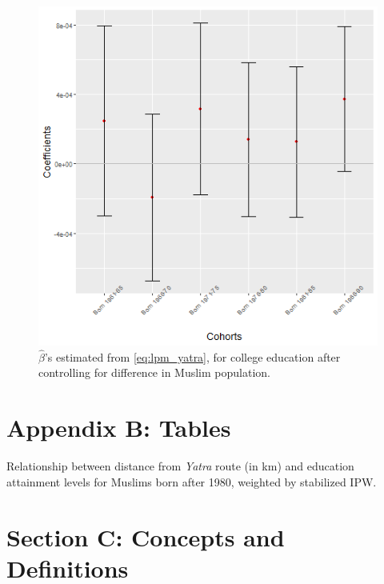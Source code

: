 \documentclass{article}
\begin{document}
\begin{figure}[H]
    \centering
    \includegraphics[scale = 0.4]{images/graph_coeff_col_mig.png}
    \caption{$\hat{\beta}$'s estimated from \eqref{eq:lpm_yatra}, for college education after controlling for difference in Muslim population.}
    \label{fig:coeff_col_mig}
\end{figure}

\newpage
\section*{Appendix B: Tables}\label{appendix_b}
\renewcommand\thetable{B.\arabic{table}}

\setcounter{table}{0}

\begin{table}[H]
    \resizebox{\textwidth}{!}{
    \centering
    
    }
    \caption{Relationship between distance from \textit{Yatra} route (in km) and education attainment levels for Muslims born after 1980, weighted by stabilized IPW.}
    \label{tab:education_score_re_old}
\end{table}

\newpage
\section*{Section C: Concepts and Definitions}
\end{document}
